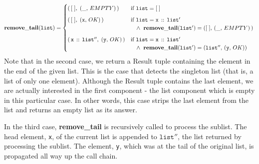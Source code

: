 \documentclass[10pt]{article}
\begin{document}
    \[
    \mathtt{\mathbf{remove\_tail}(list)} = \begin{cases}
        (\, [\;], \; (\_, \,EMPTY)\,) & \mbox{if } \mathtt{list} = [\;]\vspace*{6pt}\\
        (\, [\;], \; (\mathtt{x}, \, OK)\,) & \mbox{if } \mathtt{list = x\,::\,list'}\\
                                                & \hspace*{10pt}\wedge\;\; \mathtt{\mathbf{remove\_tail}(list')} = ([\;], \,(\_, \,EMPTY)\,)\vspace*{6pt}\\
        (\, \mathtt{x\,::\,list''}, \; (\mathtt{y}, \, OK)\,) & \mbox{if } \mathtt{list = x\,::\,list'}\\
                                                   & \hspace*{10pt}\wedge\;\; \mathtt{\mathbf{remove\_tail}(list')} = (\mathtt{list''}, \,(\mathtt{y},\, OK))
    \end{cases}\vspace*{2pt}\\
    \]
  \noindent Note that in the second case, we return a Result tuple containing the element in the end of the given list. This is the case that detects the singleton list (that is, a list of only one element). Although the Result tuple contains the last element, we are actually interested in the first component - the list component which is empty in this particular case. In other words, this case strips the last element from the list and returns an empty list as its answer.

  In the third case, \textbf{remove\_tail} is recursively called to process the sublist. The head element, \texttt{x}, of the current list is appended to $\mathtt{list''}$, the list returned by processing the sublist. The element, \texttt{y}, which was at the tail of the original list, is propagated all way up the call chain. 
\end{document}
